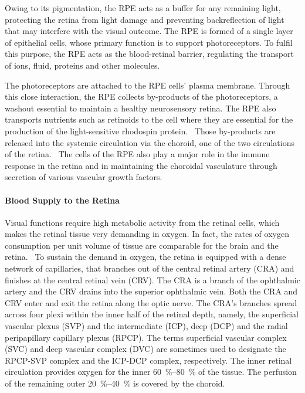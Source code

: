 \documentclass{article}
\begin{document}
Owing to its pigmentation, the RPE acts as a buffer for any remaining light, protecting the retina from light damage and preventing backreflection of light that may interfere with the visual outcome.
The RPE is formed of a single layer of epithelial cells, whose primary function is to support photoreceptors.
To fulfil this purpose, the RPE acts as the blood-retinal barrier, regulating the transport of ions, fluid, proteins and other molecules.~\cite{Boulton_2001}

The photoreceptors are attached to the RPE cells' plasma membrane.
Through this close interaction, the RPE collects by-products of the photoreceptors, a washout essential to maintain a healthy neurosensory retina.
The RPE also transports nutrients such as retinoids to the cell where they are essential for the production of the light-sensitive rhodospin protein.~\cite{Boulton_2001} 
Those by-products are released into the systemic circulation via the choroid, one of the two circulations of the retina.~\cite{Boulton_2001}
The cells of the RPE also play a major role in the immune response in the retina and in maintaining the choroidal vasculature through secretion of various vascular growth factors.~\cite{Boulton_2001,Detrick_2020} 

\paragraph*{Blood Supply to the Retina}

Visual functions require high metabolic activity from the retinal cells, which makes the retinal tissue very demanding in oxygen.
In fact, the rates of oxygen consumption per unit volume of tissue are comparable for the brain and the retina.~\cite{Medrano_1995}
To sustain the demand in oxygen, the retina is equipped with a dense network of capillaries, that branches out of the central retinal artery (CRA) and finishes at the central retinal vein (CRV).
The CRA is a branch of the ophthalmic artery and the CRV drains into the superior ophthalmic vein.
Both the CRA and CRV enter and exit the retina along the optic nerve.
The CRA's branches spread across four plexi within the inner half of the retinal depth, namely, the superficial vascular plexus (SVP) and the intermediate (ICP), deep (DCP) and the radial peripapillary capillary plexus (RPCP).
The terms superficial vascular complex (SVC) and deep vascular complex (DVC) are sometimes used to designate the RPCP-SVP complex and the ICP-DCP complex, respectively.
The inner retinal circulation provides oxygen for the inner \SIrange{60}{80}{\percent} of the tissue.
The perfusion of the remaining outer \SIrange{20}{40}{\percent} is covered by the choroid.
\end{document}
